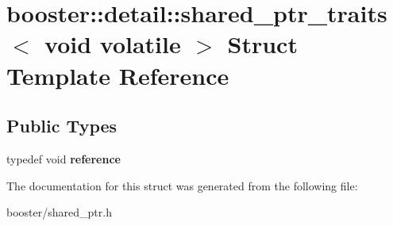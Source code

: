 \section{booster\-:\-:detail\-:\-:shared\-\_\-ptr\-\_\-traits$<$ void volatile $>$ Struct Template Reference}
\label{structbooster_1_1detail_1_1shared__ptr__traits_3_01void_01volatile_01_4}
\subsection*{Public Types}
\begin{DoxyCompactItemize}
\item 
typedef void {\bfseries reference}\label{structbooster_1_1detail_1_1shared__ptr__traits_3_01void_01volatile_01_4_a50f14dc01ccc1b66de69860c6523b417}

\end{DoxyCompactItemize}


The documentation for this struct was generated from the following file\-:\begin{DoxyCompactItemize}
\item 
booster/shared\-\_\-ptr.\-h\end{DoxyCompactItemize}

